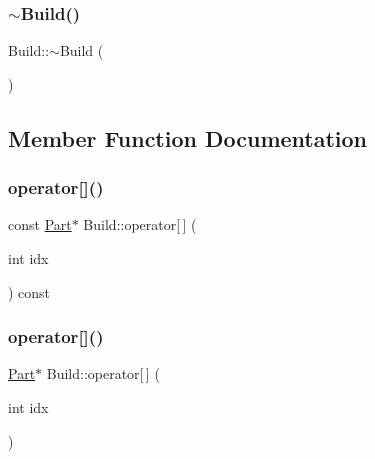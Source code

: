 \mbox{\label{class_build_a8f1d400e9bc158b6339cc1785b18d07b}} 
\subsubsection{\texorpdfstring{$\sim$Build()}{~Build()}}
{\footnotesize\ttfamily Build\+::$\sim$\+Build (\begin{DoxyParamCaption}{ }\end{DoxyParamCaption})\hspace{0.3cm}{\ttfamily [inline]}}



\subsection{Member Function Documentation}
\mbox{\label{class_build_af3e03ed173016d7ff348d1e7057bd97c}} 
\subsubsection{\texorpdfstring{operator[]()}{operator[]()}\hspace{0.1cm}{\footnotesize\ttfamily [1/2]}}
{\footnotesize\ttfamily const \mbox{\hyperlink{class_part}{Part}}$\ast$ Build\+::operator\mbox{[}$\,$\mbox{]} (\begin{DoxyParamCaption}\item[{int}]{idx }\end{DoxyParamCaption}) const\hspace{0.3cm}{\ttfamily [inline]}}

\mbox{\label{class_build_aa48e871d88c60272ab5f6cd5b97aaad0}} 
\subsubsection{\texorpdfstring{operator[]()}{operator[]()}\hspace{0.1cm}{\footnotesize\ttfamily [2/2]}}
{\footnotesize\ttfamily \mbox{\hyperlink{class_part}{Part}}$\ast$ Build\+::operator\mbox{[}$\,$\mbox{]} (\begin{DoxyParamCaption}\item[{int}]{idx }\end{DoxyParamCaption})\hspace{0.3cm}{\ttfamily [inline]}}

